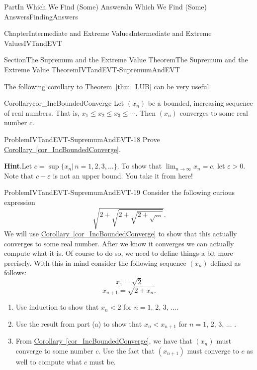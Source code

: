 \documentclass[oneside,10pt,]{book}
\newcommand{\blocktitlefont}{\relax}
\newcommand{\xreffont}{\relax}
\numberwithin{equation}{part}
\def\limit#1#2#3{{\displaystyle\lim_{#1\rightarrow #2}#3}}
\newcommand{\eps}{\varepsilon}
\newcommand{\lt}{<}
\begin{document}
\begin{partptx}{Part}{In Which We Find (Some) Answers}{}{In Which We Find (Some) Answers}{}{}{FindingAnswers}
\begin{chapterptx}{Chapter}{Intermediate and Extreme Values}{}{Intermediate and Extreme Values}{}{}{IVTandEVT}
\begin{sectionptx}{Section}{The Supremum and the Extreme Value Theorem}{}{The Supremum and the Extreme Value Theorem}{}{}{IVTandEVT-SupremumAndEVT}
\par
The following corollary to \hyperref[thm_LUB]{Theorem~{\xreffont\ref{thm_LUB}}} can be very useful.%
\begin{corollary}{Corollary}{}{}{cor_IncBoundedConverge}%
Let \((x_n)\) be a bounded, increasing sequence of real numbers. That is, \(x_1\leq x_2\leq x_3\leq\cdots\). Then \((x_n)\) converges to some real number \(c\).%
\end{corollary}
\begin{problem}{Problem}{}{IVTandEVT-SupremumAndEVT-18}%
 Prove \hyperref[cor_IncBoundedConverge]{Corollary~{\xreffont\ref{cor_IncBoundedConverge}}}.%
\par\smallskip%
\noindent\textbf{\blocktitlefont Hint}.\hypertarget{IVTandEVT-SupremumAndEVT-18-2}{}\quad{}Let \(c=\sup\{x_n|\,n=1,2,3,\ldots\}\). To show that \(\limit{n}{\infty}{x_n}=c\), let \(\eps >0.\)Note that \(c-\eps \) is not an upper bound. You take it from here!%
\end{problem}
\begin{problem}{Problem}{}{IVTandEVT-SupremumAndEVT-19}%
 Consider the following curious expression%
\begin{equation*}
\sqrt{2+\sqrt{2+\sqrt{2+\sqrt{...}}}}\text{.}
\end{equation*}
We will use \hyperref[cor_IncBoundedConverge]{Corollary~{\xreffont\ref{cor_IncBoundedConverge}}} to show that this actually converges to some real number. After we know it converges we can actually compute what it is. Of course to do so, we need to define things a bit more precisely. With this in mind consider the following sequence \(\left(x_n\right)\) defined as follows:%
\begin{equation*}
x_1=\sqrt{2}
\end{equation*}
%
\begin{equation*}
x_{n+1}=\sqrt{2+x_n}\text{.}
\end{equation*}
%
\begin{enumerate}[label={(\alph*)}]
\item{}Use induction to show that \(x_n\lt 2\) for \(n=1,\,2,\,3,\,\ldots\).%
\item{}Use the result from part (a) to show that \(x_n\lt x_{n+1}\) for \(n=1,\,2,\,3,\,\ldots\) .%
\item{}From \hyperref[cor_IncBoundedConverge]{Corollary~{\xreffont\ref{cor_IncBoundedConverge}}}, we have that \(\left(x_n\right)\) must converge to some number \(c\). Use the fact that \(\left(x_{n+1}\right)\) must converge to \(c\) as well to compute what \(c\) must be.%

\end{enumerate}
\end{problem}
\end{sectionptx}
\end{chapterptx}
\end{partptx}
\end{document}
